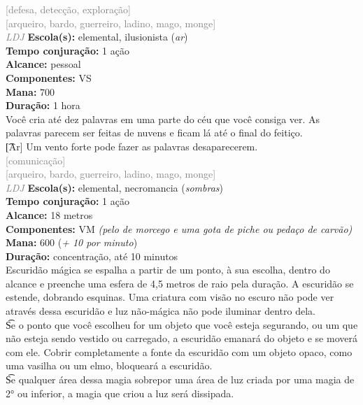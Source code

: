 \documentclass{RPG_Adventure}[2021/10/20]
\begin{document}
{\scriptsize \textcolor{gray}{[defesa, detecção, exploração]\\}}
{\scriptsize \textcolor{gray}{[arqueiro, bardo, guerreiro, ladino, mago, monge]\\}}
{\tiny \textcolor{gray}{\textit{LDJ}}}
{\small \t \textbf{Escola(s):} elemental, ilusionista (\textit{ar})\\\t \textbf{Tempo conjuração:} 1 ação\\\t \textbf{Alcance:} pessoal\\\t \textbf{Componentes:} VS\\\t \textbf{Mana:} 700\\\t \textbf{Duração:} 1 hora\\}
{\normalsize Você cria até dez palavras em uma parte do céu que você consiga ver. As palavras parecem ser feitas de nuvens e ficam lá até o final do feitiço.\\\t [Ar] Um vento forte pode fazer as palavras desaparecerem.\\}
{\scriptsize \textcolor{gray}{[comunicação]\\}}
{\scriptsize \textcolor{gray}{[arqueiro, bardo, guerreiro, ladino, mago, monge]\\}}
{\tiny \textcolor{gray}{\textit{LDJ}}}
{\small \t \textbf{Escola(s):} elemental, necromancia (\textit{sombras})\\\t \textbf{Tempo conjuração:} 1 ação\\\t \textbf{Alcance:} 18 metros\\\t \textbf{Componentes:} VM \textit{(pelo de morcego e uma gota de piche ou pedaço de carvão)}\\\t \textbf{Mana:} 600 (\textit{+ 10 por minuto})\\\t \textbf{Duração:} concentração, até 10 minutos\\}
{\normalsize Escuridão mágica se espalha a partir de um ponto, à sua escolha, dentro do alcance e preenche uma esfera de 4,5 metros de raio pela duração. A escuridão se estende, dobrando esquinas. Uma criatura com visão no escuro não pode ver através dessa escuridão e luz não-mágica não pode iluminar dentro dela.\\\t Se o ponto que você escolheu for um objeto que você esteja segurando, ou um que não esteja sendo vestido ou carregado, a escuridão emanará do objeto e se moverá com ele. Cobrir completamente a fonte da escuridão com um objeto opaco, como uma vasilha ou um elmo, bloqueará a escuridão.\\\t Se qualquer área dessa magia sobrepor uma área de luz criada por uma magia de 2° ou inferior, a magia que criou a luz será dissipada.\\}
\end{document}
